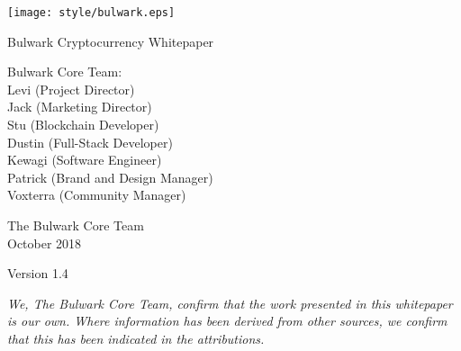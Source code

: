 \documentclass[11pt,a4paperpaper,]{report}
\date{}
\begin{document}
\begin{titlepage}
    \begin{center}


        \texttt{[image: style/bulwark.eps]}

        \vspace*{2.5cm}

        \huge
        Bulwark Cryptocurrency Whitepaper

        \vspace{1.5cm}

        \vfill

        \normalsize
        Bulwark Core Team:\\
        Levi (Project Director)\\
        Jack (Marketing Director)\\
        Stu (Blockchain Developer)\\
        Dustin (Full-Stack Developer)\\
        Kewagi (Software Engineer)\\
        Patrick (Brand and Design Manager)\\
        Voxterra (Community Manager)\\
        \vspace{0.8cm}



        \normalsize
        The Bulwark Core Team\\
        October 2018

    \normalsize
    Version 1.4

    \end{center}
\end{titlepage}

\vspace*{\fill}

\noindent
\textit{
We, The Bulwark Core Team, confirm that the work presented in this whitepaper is our own. Where information has been derived from other sources, we confirm that this has been indicated in the attributions.
} \vspace*{\fill} 
\end{document}
